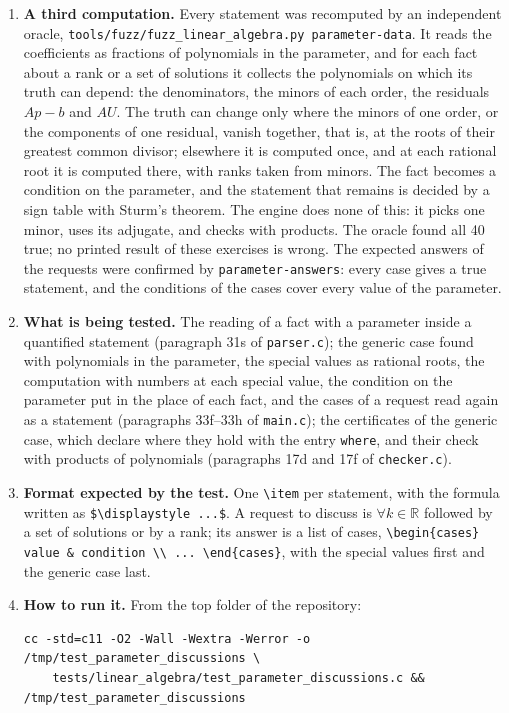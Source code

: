 \documentclass[11pt,a4paper]{article}
\begin{document}
\begin{enumerate}
\item \textbf{A third computation.} Every statement was recomputed by an independent oracle, \texttt{tools/fuzz/fuzz\_linear\_algebra.py parameter-data}. It reads the coefficients as fractions of polynomials in the parameter, and for each fact about a rank or a set of solutions it collects the polynomials on which its truth can depend: the denominators, the minors of each order, the residuals $A p - b$ and $A U$. The truth can change only where the minors of one order, or the components of one residual, vanish together, that is, at the roots of their greatest common divisor; elsewhere it is computed once, and at each rational root it is computed there, with ranks taken from minors. The fact becomes a condition on the parameter, and the statement that remains is decided by a sign table with Sturm's theorem. The engine does none of this: it picks one minor, uses its adjugate, and checks with products. The oracle found all 40 true; no printed result of these exercises is wrong. The expected answers of the requests were confirmed by \texttt{parameter-answers}: every case gives a true statement, and the conditions of the cases cover every value of the parameter.

\item \textbf{What is being tested.} The reading of a fact with a parameter inside a quantified statement (paragraph 31s of \texttt{parser.c}); the generic case found with polynomials in the parameter, the special values as rational roots, the computation with numbers at each special value, the condition on the parameter put in the place of each fact, and the cases of a request read again as a statement (paragraphs 33f--33h of \texttt{main.c}); the certificates of the generic case, which declare where they hold with the entry \texttt{where}, and their check with products of polynomials (paragraphs 17d and 17f of \texttt{checker.c}).

\item \textbf{Format expected by the test.} One \texttt{\textbackslash item} per statement, with the formula written as \texttt{\$\textbackslash displaystyle ...\$}. A request to discuss is $\forall k \in \mathbb{R}$ followed by a set of solutions or by a rank; its answer is a list of cases, \texttt{\textbackslash begin\{cases\} value \& condition \textbackslash\textbackslash{} ... \textbackslash end\{cases\}}, with the special values first and the generic case last.

\item \textbf{How to run it.} From the top folder of the repository:
\begin{verbatim}
cc -std=c11 -O2 -Wall -Wextra -Werror -o /tmp/test_parameter_discussions \
    tests/linear_algebra/test_parameter_discussions.c && /tmp/test_parameter_discussions
\end{verbatim}


\end{enumerate}
\end{document}
